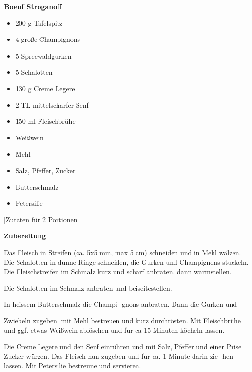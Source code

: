 

\parindent0pt	

\pagestyle{empty}


\textbf{{\LARGE Boeuf Stroganoff}}%

\hrulefill
\vspace*{\fill}
\begin{multicols}{2}	


\begin{itemize}
\item 200 g Tafelspitz
\item 4 große Champignons
\item 5 Spreewaldgurken
\item 5 Schalotten
\item 130 g Creme Legere
\item 2 TL mittelscharfer Senf
\item 150 ml Fleischbrühe
\item Weißwein
\item Mehl
\item Salz, Pfeffer, Zucker
\item Butterschmalz
\item Petersilie
\end{itemize}
\end{multicols}
\vfill									%

\vspace{1cm}
%
\begin{center}
%
[Zutaten für 2 Portionen]%
\end{center}


\vfill
\newpage
\textbf{{\LARGE Zubereitung}}%

\hrulefill

\vspace*{\fill}
\begin{multicols}{2}

Das Fleisch in Streifen (ca. 5x5 mm, max
5 cm) schneiden und in Mehl wälzen.
Die Schalotten in dunne Ringe schneiden,  
die Gurken und Champignons stuckeln.  
Die Fleischstreifen im Schmalz kurz und
scharf anbraten, dann warmstellen. \newline

Die Schalotten im Schmalz anbraten und beiseitestellen.\newline

In heissem Butterschmalz die Champi-
gnons anbraten. Dann die Gurken und

Zwiebeln zugeben, mit Mehl bestreuen
und kurz durchrösten. 
Mit Fleischbrühe 
und ggf. etwas Weißwein ablöschen und
fur ca 15 Minuten köcheln lassen.\newline

Die Creme Legere und den Senf
einrühren und mit Salz, Pfeffer und einer  
Prise Zucker würzen. Das Fleisch nun  
zugeben und fur ca. 1 Minute darin zie-  
hen lassen. Mit Petersilie bestreune und
servieren.

\end{multicols}
\vfill

